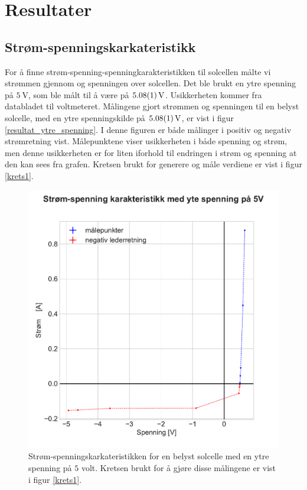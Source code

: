 \documentclass[%
 reprint,
 amsmath,amssymb,
 aps,
 norsk,
 booktabs
]{revtex4-1}
\begin{document}
\section{Resultater}
\subsection{Strøm-spenningskarkateristikk}
For å finne strøm-spenning-spenningkarakteristikken til solcellen målte vi strømmen gjennom og spenningen over solcellen. Det ble brukt en ytre spenning på $\SI{5}{\volt}$, som ble målt til å være på $\SI{5.08\pm0.01}{\volt}$. Usikkerheten kommer fra databladet til voltmeteret. Målingene gjort strømmen og spenningen til en belyst solcelle, med en ytre spenningskilde på $\SI{5.08\pm0.01}{\volt}$, er vist i figur \vref{resultat_ytre_spenning}. I denne figuren er både målinger i positiv og negativ strømretning vist. Målepunktene viser usikkerheten i både spenning og strøm, men denne usikkerheten er for liten iforhold til endringen i strøm og spenning at den kan sees fra grafen. Kretsen brukt for generere og måle verdiene er vist i figur \vref{krets1}. \\
\begin{figure}
  \centering
  \includegraphics[scale=0.47]{ytre_spenning.pdf}
  \caption{Strøm-spenningskarkateristikken for en belyst solcelle med en ytre spenning på $5$ volt. Kretsen brukt for å gjøre disse målingene er vist i figur \vref{krets1}.}
  \label{resultat_ytre_spenning}
\end{figure}
\end{document}
